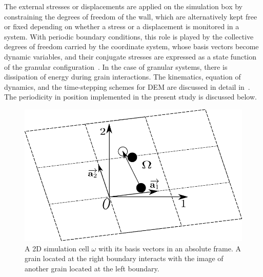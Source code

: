 The external stresses or displacements are applied on the simulation box by 
constraining the degrees of freedom of the wall, which are alternatively kept 
free or fixed depending on whether a stress or a displacement is monitored in a 
system. With periodic boundary conditions, this role is played by the 
collective degrees of freedom carried by the coordinate system, whose basis 
vectors become dynamic variables, and their conjugate stresses are expressed as 
a state function of the granular configuration~\citep{Parrinello1980}. In the 
case of granular systems, there is dissipation of energy during grain 
interactions. The kinematics, equation of dynamics, and the time-stepping 
schemes for DEM are discussed in detail 
in~\citet{Voiv2011}. The periodicity in position implemented in the present 
study is discussed below. 
%
\begin{figure}[htbp]
\centering
\includegraphics[scale=0.65]{periodic}
\caption[A 2D simulation cell $\omega$ with its basis vectors in an absolute 
frame]{A 2D simulation cell $\omega$ with its basis vectors in an absolute 
frame. A grain located at the right boundary interacts with the image of 
another grain located at the left boundary.}
\label{fig:periodic}
\end{figure}

